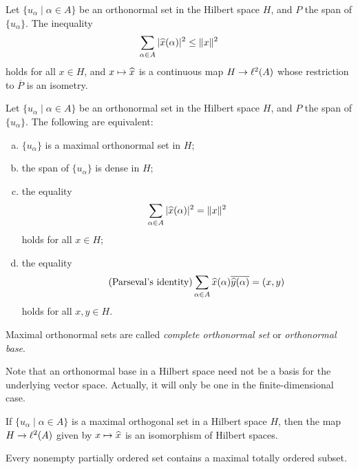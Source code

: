 \begin{theorem}
  Let $\{ u_\alpha \;|\; \alpha \in A \}$ be an orthonormal set in the Hilbert space $H$, and $P$ the span of $\{u_\alpha\}$. The inequality
  \[
  \sum_{\alpha \in A} |\widehat{x}(\alpha)|^2 \leq \|x\|^2
  \]
  holds for all $x \in H$, and $x \mapsto \widehat{x}$ is a continuous map $H \rightarrow \ell^2(A)$ whose restriction to $\overline{P}$ is an isometry.
\end{theorem}

\begin{theorem}
  Let $\{ u_\alpha \;|\; \alpha \in A \}$ be an orthonormal set in the Hilbert space $H$, and $P$ the span of $\{u_\alpha\}$. The following are equivalent:
  \begin{enumerate}[(a)]
  \item $\{u_\alpha\}$ is a maximal orthonormal set in $H$;
  \item the span of $\{u_\alpha\}$ is dense in $H$;
  \item the equality
    \[
    \sum_{\alpha \in A} |\widehat{x}(\alpha)|^2 = \|x\|^2
    \]
    holds for all $x \in H$;
  \item the equality
    \[
    \tag{Parseval's identity}
    \sum_{\alpha \in A} \widehat{x}(\alpha) \overline{\widehat{y}(\alpha)} = (x,y)
    \]
    holds for all $x,y \in H$.
  \end{enumerate}
\end{theorem}

\begin{definition}
  Maximal orthonormal sets are called \emph{complete orthonormal set} or \emph{orthonormal base}.
\end{definition}

\begin{remark}
  Note that an orthonormal base in a Hilbert space need not be a basis for the underlying vector space. Actually, it will only be one in the finite-dimensional case.
\end{remark}

\begin{corollary}
  If $\{ u_\alpha \;|\; \alpha \in A \}$ is a maximal orthogonal set in a Hilbert space $H$, then the map $H \rightarrow \ell^2(A)$ given by $x \mapsto \widehat{x}$ is an isomorphism of Hilbert spaces.
\end{corollary}

\begin{theorem}
  Every nonempty partially ordered set contains a maximal totally ordered subset.  
\end{theorem}

